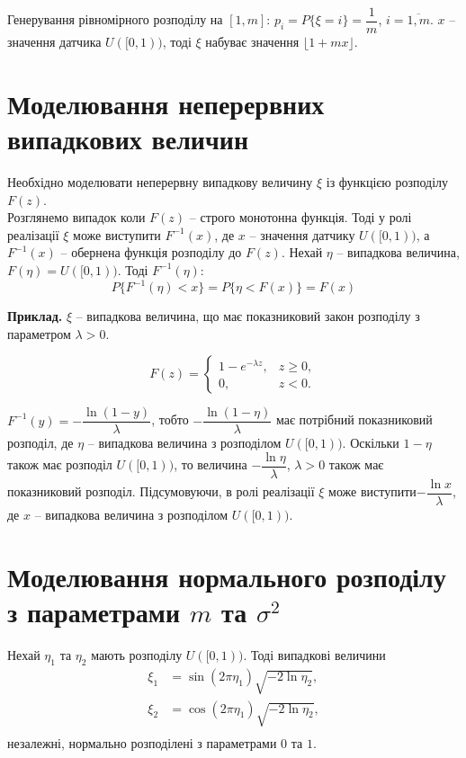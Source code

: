 Генерування рівномірного розподілу на $[1, m]$: $p_i = P \{ \xi = i \} = \dfrac{1}{m}$, $i = \overline{1,m}$. $x$ -- значення датчика $U([0,1))$, тоді $\xi$ набуває значення $\lfloor 1 + m x \rfloor$.

\section{Моделювання неперервних випадкових величин}

Необхідно моделювати неперервну випадкову величину $\xi$ із функцією розподілу $F(z)$. \\

Розглянемо випадок коли $F(z)$ -- строго монотонна функція. Тоді у ролі реалізації $\xi$ може виступити $F^{-1}(x)$, де $x$ -- значення датчику $U([0,1))$, а $F^{-1}(x)$ -- обернена функція розподілу до $F(z)$. Нехай $\eta$ -- випадкова величина, $F(\eta) = U([0, 1))$. Тоді $F^{-1}(\eta)$:
\[ P\{ F^{-1}(\eta) < x \} = P \{ \eta < F(x) \} = F(x) \]

\textbf{Приклад.} $\xi$ -- випадкова величина, що має показниковий закон розподілу з параметром $\lambda > 0$.

\[ F(z) = \begin{cases} 1 - e^{-\lambda z}, & z \ge 0, \\ 0, & z < 0. \end{cases} \]

$F^{-1}(y) = - \dfrac{\ln(1-y)}{\lambda}$, тобто $- \dfrac{\ln(1 - \eta)}{\lambda}$ має потрібний показниковий розподіл, де $\eta$ -- випадкова величина з розподілом $U([0,1))$. Оскільки $1 - \eta$ також має розподіл $U([0,1))$, то величина $-\dfrac{\ln \eta}{\lambda}$, $\lambda > 0$ також має показниковий розподіл. Підсумовуючи, в ролі реалізації $\xi$ може виступити$-\dfrac{\ln x}{\lambda}$, де $x$ -- випадкова величина з розподілом $U([0,1))$.

\section{Моделювання нормального розподілу з параметрами $m$ та $\sigma^2$}

\begin{theorem}
    Нехай $\eta_1$ та $\eta_2$ мають розподілу $U([0,1))$. Тоді випадкові величини
    \begin{align*}
        \xi_1 &= \sin(2 \pi \eta_1) \sqrt{-2 \ln \eta_2}, \\
        \xi_2 &= \cos(2 \pi \eta_1) \sqrt{-2 \ln \eta_2}, \\
    \end{align*}
    незалежні, нормально розподілені з параметрами $0$ та $1$.
\end{theorem}

